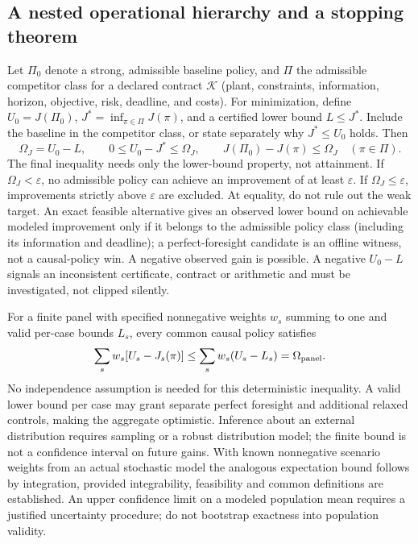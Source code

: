 \documentclass[11pt,letterpaper]{article}
\begin{document}
\subsection{A nested operational hierarchy and a stopping theorem}
Let $\Pi_0$ denote a strong, admissible baseline policy, and $\Pi$ the admissible competitor class for a declared contract $\mathcal K$ (plant, constraints, information, horizon, objective, risk, deadline, and costs). For minimization, define $U_0=J(\Pi_0)$, $J^*=\inf_{\pi\in\Pi}J(\pi)$, and a certified lower bound $L\le J^*$. Include the baseline in the competitor class, or state separately why $J^*\le U_0$ holds. Then
\begin{equation}
 \Omega_J=U_0-L,\qquad
 0\le U_0-J^*\le\Omega_J,\qquad
 J(\Pi_0)-J(\pi)\le\Omega_J\quad(\pi\in\Pi).
 \label{eq:coa}
\end{equation}
The final inequality needs only the lower-bound property, not attainment. If $\Omega_J<\varepsilon$, no admissible policy can achieve an improvement of at least $\varepsilon$. If $\Omega_J\le\varepsilon$, improvements strictly above $\varepsilon$ are excluded. At equality, do not rule out the weak target. An exact feasible alternative gives an observed lower bound on achievable modeled improvement only if it belongs to the admissible policy class (including its information and deadline); a perfect-foresight candidate is an offline witness, not a causal-policy win. A negative observed gain is possible. A negative $U_0-L$ signals an inconsistent certificate, contract or arithmetic and must be investigated, not clipped silently.

For a finite panel with specified nonnegative weights $w_s$ summing to one and valid per-case bounds $L_s$, every common causal policy satisfies
\begin{equation}
 \sum_s w_s[U_s-J_s(\pi)]\le \sum_s w_s(U_s-L_s)=\Omega_{\rm panel}.
\end{equation}
No independence assumption is needed for this deterministic inequality. A valid lower bound per case may grant separate perfect foresight and additional relaxed controls, making the aggregate optimistic. Inference about an external distribution requires sampling or a robust distribution model; the finite bound is not a confidence interval on future gains. With known nonnegative scenario weights from an actual stochastic model the analogous expectation bound follows by integration, provided integrability, feasibility and common definitions are established. An upper confidence limit on a modeled population mean requires a justified uncertainty procedure; do not bootstrap exactness into population validity.
\end{document}
